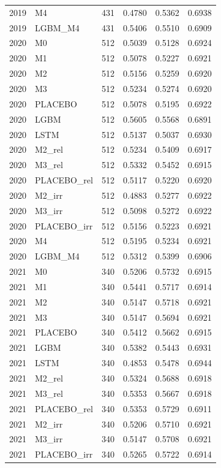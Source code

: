 \begin{tabular}{llrrrr}
2019 & M4 & 431 & 0.4780 & 0.5362 & 0.6938 \\
2019 & LGBM\_M4 & 431 & 0.5406 & 0.5510 & 0.6909 \\
2020 & M0 & 512 & 0.5039 & 0.5128 & 0.6924 \\
2020 & M1 & 512 & 0.5078 & 0.5227 & 0.6921 \\
2020 & M2 & 512 & 0.5156 & 0.5259 & 0.6920 \\
2020 & M3 & 512 & 0.5234 & 0.5274 & 0.6920 \\
2020 & PLACEBO & 512 & 0.5078 & 0.5195 & 0.6922 \\
2020 & LGBM & 512 & 0.5605 & 0.5568 & 0.6891 \\
2020 & LSTM & 512 & 0.5137 & 0.5037 & 0.6930 \\
2020 & M2\_rel & 512 & 0.5234 & 0.5409 & 0.6917 \\
2020 & M3\_rel & 512 & 0.5332 & 0.5452 & 0.6915 \\
2020 & PLACEBO\_rel & 512 & 0.5117 & 0.5220 & 0.6920 \\
2020 & M2\_irr & 512 & 0.4883 & 0.5277 & 0.6922 \\
2020 & M3\_irr & 512 & 0.5098 & 0.5272 & 0.6922 \\
2020 & PLACEBO\_irr & 512 & 0.5156 & 0.5223 & 0.6921 \\
2020 & M4 & 512 & 0.5195 & 0.5234 & 0.6921 \\
2020 & LGBM\_M4 & 512 & 0.5312 & 0.5399 & 0.6906 \\
2021 & M0 & 340 & 0.5206 & 0.5732 & 0.6915 \\
2021 & M1 & 340 & 0.5441 & 0.5717 & 0.6914 \\
2021 & M2 & 340 & 0.5147 & 0.5718 & 0.6921 \\
2021 & M3 & 340 & 0.5147 & 0.5694 & 0.6921 \\
2021 & PLACEBO & 340 & 0.5412 & 0.5662 & 0.6915 \\
2021 & LGBM & 340 & 0.5382 & 0.5443 & 0.6931 \\
2021 & LSTM & 340 & 0.4853 & 0.5478 & 0.6944 \\
2021 & M2\_rel & 340 & 0.5324 & 0.5688 & 0.6918 \\
2021 & M3\_rel & 340 & 0.5353 & 0.5667 & 0.6918 \\
2021 & PLACEBO\_rel & 340 & 0.5353 & 0.5729 & 0.6911 \\
2021 & M2\_irr & 340 & 0.5206 & 0.5710 & 0.6921 \\
2021 & M3\_irr & 340 & 0.5147 & 0.5708 & 0.6921 \\
2021 & PLACEBO\_irr & 340 & 0.5265 & 0.5722 & 0.6914 \\

\end{tabular}
